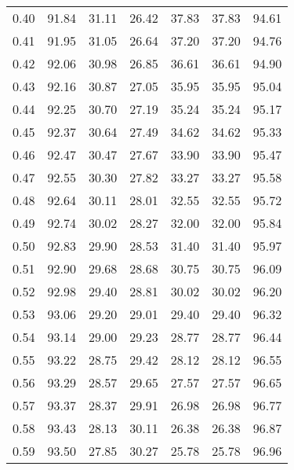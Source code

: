 \begin{tabular}{|c|c|c|c|c|c|c|}
      0.40 &     91.84 &     31.11 &      26.42 &   37.83 &      37.83 &         94.61 \\
      0.41 &     91.95 &     31.05 &      26.64 &   37.20 &      37.20 &         94.76 \\
      0.42 &     92.06 &     30.98 &      26.85 &   36.61 &      36.61 &         94.90 \\
      0.43 &     92.16 &     30.87 &      27.05 &   35.95 &      35.95 &         95.04 \\
      0.44 &     92.25 &     30.70 &      27.19 &   35.24 &      35.24 &         95.17 \\
      0.45 &     92.37 &     30.64 &      27.49 &   34.62 &      34.62 &         95.33 \\
      0.46 &     92.47 &     30.47 &      27.67 &   33.90 &      33.90 &         95.47 \\
      0.47 &     92.55 &     30.30 &      27.82 &   33.27 &      33.27 &         95.58 \\
      0.48 &     92.64 &     30.11 &      28.01 &   32.55 &      32.55 &         95.72 \\
      0.49 &     92.74 &     30.02 &      28.27 &   32.00 &      32.00 &         95.84 \\
      0.50 &     92.83 &     29.90 &      28.53 &   31.40 &      31.40 &         95.97 \\
      0.51 &     92.90 &     29.68 &      28.68 &   30.75 &      30.75 &         96.09 \\
      0.52 &     92.98 &     29.40 &      28.81 &   30.02 &      30.02 &         96.20 \\
      0.53 &     93.06 &     29.20 &      29.01 &   29.40 &      29.40 &         96.32 \\
      0.54 &     93.14 &     29.00 &      29.23 &   28.77 &      28.77 &         96.44 \\
      0.55 &     93.22 &     28.75 &      29.42 &   28.12 &      28.12 &         96.55 \\
      0.56 &     93.29 &     28.57 &      29.65 &   27.57 &      27.57 &         96.65 \\
      0.57 &     93.37 &     28.37 &      29.91 &   26.98 &      26.98 &         96.77 \\
      0.58 &     93.43 &     28.13 &      30.11 &   26.38 &      26.38 &         96.87 \\
      0.59 &     93.50 &     27.85 &      30.27 &   25.78 &      25.78 &         96.96 \\

\end{tabular}
